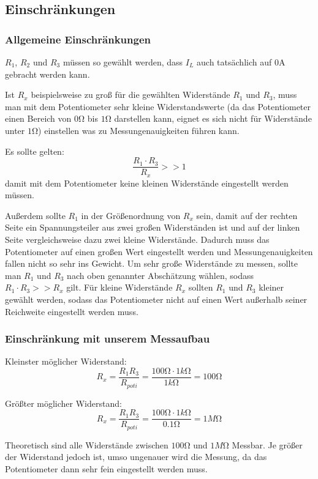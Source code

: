 \documentclass[10pt]{report}
\begin{document}
        \subsection{Einschränkungen}
        \subsubsection{Allgemeine Einschränkungen}
        $R_1$, $R_2$ und $R_3$ müssen so gewählt werden, dass $I_L$ auch tatsächlich
        auf $0$A gebracht werden kann.

        \vspace{0.5cm}

        Ist $R_x$ beispielsweise zu groß für die gewählten Widerstände $R_1$ und $R_3$, muss
        man mit dem Potentiometer sehr kleine Widerstandswerte (da das Potentiometer einen
		Bereich von $0\si{\ohm}$ bis $1\si{\ohm}$ darstellen kann, eignet es sich nicht für
		Widerstände unter $1\si{\ohm}$) einstellen was zu Messungenauigkeiten führen kann.

        Es sollte gelten:
        \begin{equation*}
            \frac{R_1 \cdot R_3}{R_x} >> 1
        \end{equation*}
        damit mit dem Potentiometer keine kleinen Widerstände eingestellt werden
        müssen.

        Außerdem sollte $R_1$ in der Größenordnung von $R_x$ sein, damit auf der
        rechten Seite ein Spannungsteiler aus zwei großen Widerständen ist und auf
        der linken Seite vergleichsweise dazu zwei kleine Widerstände. Dadurch
        muss das Potentiometer auf einen großen Wert eingestellt werden und
        Messungenauigkeiten fallen nicht so sehr ins Gewicht.
		Um sehr große Widerstände zu messen, sollte man $R_1$ und $R_3$ nach oben genannter
		Abschätzung wählen, sodass $R_1 \cdot R_3 >> R_x$ gilt. Für kleine Widerstände $R_x$
		sollten $R_1$ und $R_3$ kleiner gewählt werden, sodass das Potentiometer nicht auf einen
		Wert außerhalb seiner Reichweite eingestellt werden muss.


        \subsubsection{Einschränkung mit unserem Messaufbau}
        Kleinster möglicher Widerstand:
        \begin{equation*}
            R_x = \frac{R_1 R_3}{R_{poti}} = \frac{100\si{\ohm} \cdot 1\si{k\ohm}}{1\si{k\ohm}} = 100\si{\ohm}
        \end{equation*}

        Größter möglicher Widerstand:
        \begin{equation*}
            R_x = \frac{R_1 R_3}{R_{poti}} = \frac{100\si{\ohm} \cdot 1\si{k\ohm}}{0.1\si{\ohm}} = 1\si{M\ohm}
        \end{equation*}

        Theoretisch sind alle Widerstände zwischen $100\si{\ohm}$ und $1\si{M\ohm}$ Messbar.
        Je größer der Widerstand jedoch ist, umso ungenauer wird die Messung,
        da das Potentiometer dann sehr fein eingestellt werden muss.
\end{document}
